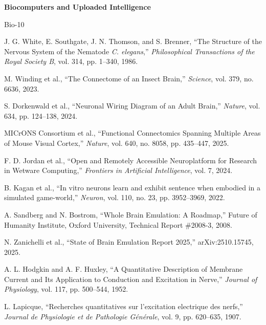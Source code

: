 \documentclass[12pt, a4paper]{article}
\begin{document}
{\noindent\bfseries Biocomputers and Uploaded Intelligence}\par\smallskip
\begin{thebibliography}{Bio-10}

 J. G. White, E. Southgate, J. N. Thomson, and S. Brenner, ``The Structure
    of the Nervous System of the Nematode \textit{C. elegans},'' \textit{Philosophical Transactions
    of the Royal Society B}, vol. 314, pp. 1--340, 1986.

 M. Winding et al., ``The Connectome of an Insect Brain,'' \textit{Science},
    vol. 379, no. 6636, 2023.

 S. Dorkenwald et al., ``Neuronal Wiring Diagram of an Adult Brain,''
    \textit{Nature}, vol. 634, pp. 124--138, 2024.

 MICrONS Consortium et al., ``Functional Connectomics Spanning Multiple Areas
    of Mouse Visual Cortex,'' \textit{Nature}, vol. 640, no. 8058, pp. 435--447, 2025.

 F. D. Jordan et al., ``Open and Remotely Accessible Neuroplatform for
    Research in Wetware Computing,'' \textit{Frontiers in Artificial Intelligence}, vol. 7, 2024.

 B. Kagan et al., ``In vitro neurons learn and exhibit sentence when embodied
    in a simulated game-world,'' \textit{Neuron}, vol. 110, no. 23, pp. 3952--3969, 2022.

 A. Sandberg and N. Bostrom, ``Whole Brain Emulation: A Roadmap,'' Future of
    Humanity Institute, Oxford University, Technical Report \#2008-3, 2008.

 N. Zanichelli et al., ``State of Brain Emulation Report 2025,''
    arXiv:2510.15745, 2025.

 A. L. Hodgkin and A. F. Huxley, ``A Quantitative Description of Membrane
    Current and Its Application to Conduction and Excitation in Nerve,'' \textit{Journal of
    Physiology}, vol. 117, pp. 500--544, 1952.

 L. Lapicque, ``Recherches quantitatives sur l'excitation electrique des
    nerfs,'' \textit{Journal de Physiologie et de Pathologie G\'{e}n\'{e}rale}, vol. 9,
    pp. 620--635, 1907.

\end{thebibliography}
\end{document}
